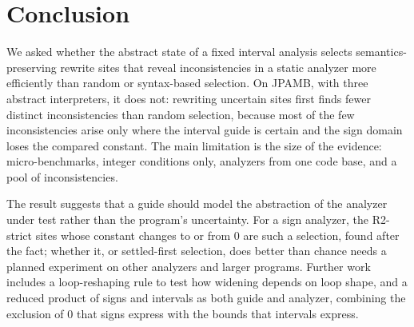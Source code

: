 \section{Conclusion}
\label{sec:conclusion}
We asked whether the abstract state of a fixed interval analysis selects
semantics-preserving rewrite sites that reveal inconsistencies in a static
analyzer more efficiently than random or syntax-based selection. On JPAMB, with
three abstract interpreters, it does not: rewriting uncertain sites first finds
fewer distinct inconsistencies than random selection, because most of the
few inconsistencies arise only where the interval guide is certain and the
sign domain loses the compared constant. The main limitation is the size of the evidence:
micro-benchmarks, integer conditions only, analyzers from one code base, and a
pool of \Pool{} inconsistencies.

The result suggests that a guide should model the abstraction of the analyzer
under test rather than the program's uncertainty. For a sign analyzer, the
\NumStrictCrossZero{} R2-strict sites whose constant changes to or from $0$ are
such a selection, found after the fact; whether it, or settled-first selection, does better than
chance needs a planned experiment on other analyzers and larger programs.
Further work includes a loop-reshaping rule to test how widening depends on
loop shape, and a reduced product of signs and intervals as both guide and
analyzer, combining the exclusion of $0$ that signs express with the bounds
that intervals express.
